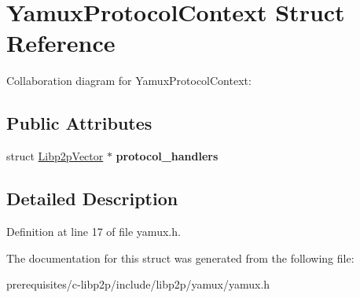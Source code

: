 \hypertarget{struct_yamux_protocol_context}{}\section{Yamux\+Protocol\+Context Struct Reference}
\label{struct_yamux_protocol_context}


Collaboration diagram for Yamux\+Protocol\+Context\+:
\subsection*{Public Attributes}
\begin{DoxyCompactItemize}
\item 
\mbox{\label{struct_yamux_protocol_context_a2712a2b3bedfd4b24f7851ea25f53610}} 
struct \mbox{\hyperlink{struct_libp2p_vector}{Libp2p\+Vector}} $\ast$ {\bfseries protocol\+\_\+handlers}
\end{DoxyCompactItemize}


\subsection{Detailed Description}


Definition at line 17 of file yamux.\+h.



The documentation for this struct was generated from the following file\+:\begin{DoxyCompactItemize}
\item 
prerequisites/c-\/libp2p/include/libp2p/yamux/yamux.\+h\end{DoxyCompactItemize}
